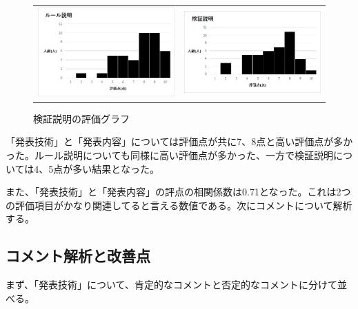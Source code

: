 \begin{figure}[h]
 \begin{tabular}{cc}
  \begin{minipage}[h]{0.45\hsize}
  \centering
 \includegraphics[width=0.7\linewidth]{./figure/evaluation-ru-ru.jpg}
\caption{ルール説明の評価グラフ}
\label{evaluation-ru-ru}
 \end{minipage} &

\begin{minipage}[h]{0.45\hsize}
  \centering
 \includegraphics[width=0.7\linewidth]{./figure/kensyou.jpg}
 \caption{検証説明の評価グラフ}
\label{evaluation-kensyou}
\end{minipage} 
\end{tabular}
\end{figure}

「発表技術」と「発表内容」については評価点が共に7、8点と高い評価点が多かった。ルール説明についても同様に高い評価点が多かった、一方で検証説明については4、5点が多い結果となった。

また、「発表技術」と「発表内容」の評点の相関係数は0.71となった。これは2つの評価項目がかなり関連してると言える数値である。次にコメントについて解析する。

\subsection{コメント解析と改善点}
まず、「発表技術」について、肯定的なコメントと否定的なコメントに分けて並べる。

